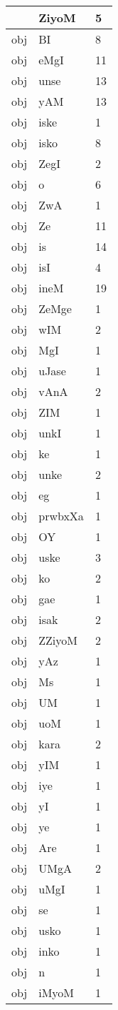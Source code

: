 \documentclass[a4 paper]{article}
\begin{document}
\begin{longtable}{cp{}p{}}
 & ZiyoM & 5\\ \midrule obj & BI & 8\\ \midrule obj & eMgI & 11\\ \midrule obj & unse & 13\\ \midrule obj & yAM & 13\\ \midrule obj & iske & 1\\ \midrule obj & isko & 8\\ \midrule obj & ZegI & 2\\ \midrule obj & o & 6\\ \midrule obj & ZwA & 1\\ \midrule obj & Ze & 11\\ \midrule obj & is & 14\\ \midrule obj & isI & 4\\ \midrule obj & ineM & 19\\ \midrule obj & ZeMge & 1\\ \midrule obj & wIM & 2\\ \midrule obj & MgI & 1\\ \midrule obj & uJase & 1\\ \midrule obj & vAnA & 2\\ \midrule obj & ZIM & 1\\ \midrule obj & unkI & 1\\ \midrule obj & ke & 1\\ \midrule obj & unke & 2\\ \midrule obj & eg & 1\\ \midrule obj & prwbxXa & 1\\ \midrule obj & OY & 1\\ \midrule obj & uske & 3\\ \midrule obj & ko & 2\\ \midrule obj & gae & 1\\ \midrule obj & isak & 2\\ \midrule obj & ZZiyoM & 2\\ \midrule obj & yAz & 1\\ \midrule obj & Ms & 1\\ \midrule obj & UM & 1\\ \midrule obj & uoM & 1\\ \midrule obj & kara & 2\\ \midrule obj & yIM & 1\\ \midrule obj & iye & 1\\ \midrule obj & yI & 1\\ \midrule obj & ye & 1\\ \midrule obj & Are & 1\\ \midrule obj & UMgA & 2\\ \midrule obj & uMgI & 1\\ \midrule obj & se & 1\\ \midrule obj & usko & 1\\ \midrule obj & inko & 1\\ \midrule obj & n & 1\\ \midrule obj & iMyoM & 1\\ \midrule 

\end{longtable}
\end{document}
